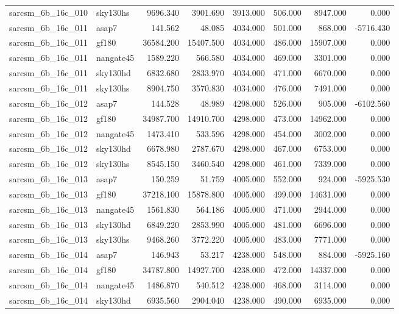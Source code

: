 \begin{tabular}{llrrrrrr}
sarcsm\_6b\_16c\_010 & sky130hs & 9696.340 & 3901.690 & 3913.000 & 506.000 & 8947.000 & 0.000 \\
sarcsm\_6b\_16c\_011 & asap7 & 141.562 & 48.085 & 4034.000 & 501.000 & 868.000 & -5716.430 \\
sarcsm\_6b\_16c\_011 & gf180 & 36584.200 & 15407.500 & 4034.000 & 486.000 & 15907.000 & 0.000 \\
sarcsm\_6b\_16c\_011 & nangate45 & 1589.220 & 566.580 & 4034.000 & 469.000 & 3301.000 & 0.000 \\
sarcsm\_6b\_16c\_011 & sky130hd & 6832.680 & 2833.970 & 4034.000 & 471.000 & 6670.000 & 0.000 \\
sarcsm\_6b\_16c\_011 & sky130hs & 8904.750 & 3570.830 & 4034.000 & 476.000 & 7491.000 & 0.000 \\
sarcsm\_6b\_16c\_012 & asap7 & 144.528 & 48.989 & 4298.000 & 526.000 & 905.000 & -6102.560 \\
sarcsm\_6b\_16c\_012 & gf180 & 34987.700 & 14910.700 & 4298.000 & 473.000 & 14962.000 & 0.000 \\
sarcsm\_6b\_16c\_012 & nangate45 & 1473.410 & 533.596 & 4298.000 & 454.000 & 3002.000 & 0.000 \\
sarcsm\_6b\_16c\_012 & sky130hd & 6678.980 & 2787.670 & 4298.000 & 467.000 & 6753.000 & 0.000 \\
sarcsm\_6b\_16c\_012 & sky130hs & 8545.150 & 3460.540 & 4298.000 & 461.000 & 7339.000 & 0.000 \\
sarcsm\_6b\_16c\_013 & asap7 & 150.259 & 51.759 & 4005.000 & 552.000 & 924.000 & -5925.530 \\
sarcsm\_6b\_16c\_013 & gf180 & 37218.100 & 15878.800 & 4005.000 & 499.000 & 14631.000 & 0.000 \\
sarcsm\_6b\_16c\_013 & nangate45 & 1561.830 & 564.186 & 4005.000 & 471.000 & 2944.000 & 0.000 \\
sarcsm\_6b\_16c\_013 & sky130hd & 6849.220 & 2853.990 & 4005.000 & 481.000 & 6696.000 & 0.000 \\
sarcsm\_6b\_16c\_013 & sky130hs & 9468.260 & 3772.220 & 4005.000 & 483.000 & 7771.000 & 0.000 \\
sarcsm\_6b\_16c\_014 & asap7 & 146.943 & 53.217 & 4238.000 & 548.000 & 884.000 & -5925.160 \\
sarcsm\_6b\_16c\_014 & gf180 & 34787.800 & 14927.700 & 4238.000 & 472.000 & 14337.000 & 0.000 \\
sarcsm\_6b\_16c\_014 & nangate45 & 1486.870 & 540.512 & 4238.000 & 468.000 & 3114.000 & 0.000 \\
sarcsm\_6b\_16c\_014 & sky130hd & 6935.560 & 2904.040 & 4238.000 & 490.000 & 6935.000 & 0.000 \\

\end{tabular}
